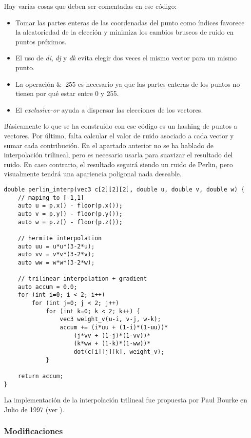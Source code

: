 Hay varias cosas que deben ser comentadas en ese código:
\begin{itemize}
\item Tomar las partes enteras de las coordenadas del punto como índices favorece la aleatoriedad de la elección y minimiza los cambios bruscos de ruido en puntos próximos.
\item El uso de \textit{di}, \textit{dj} y \textit{dk} evita elegir dos veces el mismo vector para un mismo punto.
\item La operación $\& \;\; 255$ es necesario ya que las partes enteras de los puntos no tienen por qué estar entre 0 y 255.
\item El \textit{exclusive-or} ayuda a dispersar las elecciones de los vectores.
\end{itemize}

Básicamente lo que se ha construido con ese código es un hashing de puntos a vectores. Por último, falta calcular el valor de ruido asociado a cada vector y sumar cada contribución. En el apartado anterior no se ha hablado de interpolación trilineal, pero es necesario usarla para suavizar el resultado del ruido. En caso contrario, el resultado seguirá siendo un ruido de Perlin, pero visualmente tendrá una apariencia poligonal nada deseable.

\begin{lstlisting}[basicstyle=\footnotesize]
double perlin_interp(vec3 c[2][2][2], double u, double v, double w) {
    // maping to [-1,1]
    auto u = p.x() - floor(p.x());
    auto v = p.y() - floor(p.y());
    auto w = p.z() - floor(p.z());
    
    // hermite interpolation
    auto uu = u*u*(3-2*u);
    auto vv = v*v*(3-2*v);
    auto ww = w*w*(3-2*w);
    
    // trilinear interpolation + gradient
    auto accum = 0.0;
    for (int i=0; i < 2; i++)
        for (int j=0; j < 2; j++)
            for (int k=0; k < 2; k++) {
                vec3 weight_v(u-i, v-j, w-k);
                accum += (i*uu + (1-i)*(1-uu))*
                    (j*vv + (1-j)*(1-vv))*
                    (k*ww + (1-k)*(1-ww))*
                    dot(c[i][j][k], weight_v);
            }

    return accum;
}
\end{lstlisting}

La implementación de la interpolación trilineal fue propuesta por Paul Bourke en Julio de 1997 (ver \cite{paulbourke}).

\subsubsection{Modificaciones}

